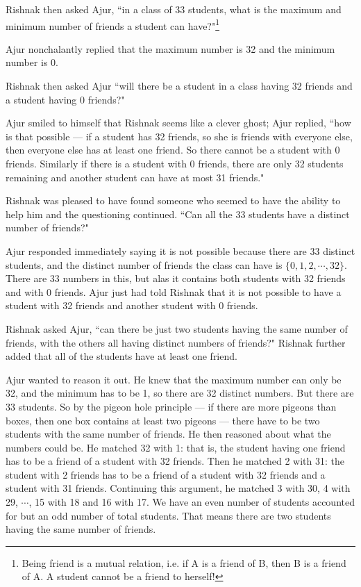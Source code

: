  Rishnak then asked Ajur, ``in a class of 33 students, what is the maximum and minimum number of friends a student can have?"\footnote{Being friend is a mutual relation, i.e. if A is a friend of B, then B is a friend of A. A student cannot be a friend to herself!}
 
 Ajur nonchalantly replied that the maximum number is 32 and the minimum number is 0.
 
 Rishnak then asked Ajur ``will there be a student in a class having 32 friends and a student having 0 friends?"
 
 Ajur smiled to himself that Rishnak seems like a clever ghost; Ajur replied, ``how is that possible --- if a student has 32 friends, so she is friends with everyone else, then everyone else has at least one friend. So there cannot be a student with 0 friends. Similarly if there is a student with 0 friends, there are only 32 students remaining and another student can have at most 31 friends."
 
 Rishnak was pleased to have found someone who seemed to have the ability to help him and the questioning continued. ``Can all the 33 students have a distinct number of friends?"
 
 Ajur responded immediately saying it is not possible because there are 33 distinct students, and the distinct number of friends the class can have is $\{0,1,2,\cdots,32\}$. There are 33 numbers in this, but alas it contains both students with 32 friends and with 0 friends. Ajur just had told Rishnak that it is not possible to have a student with 32 friends and another student with 0 friends.
 
 Rishnak asked Ajur, ``can there be just two students having the same number of friends, with the others all having distinct numbers of friends?" Rishnak further added that all of the students have at least one friend.
 
Ajur wanted to reason it out. He knew that the maximum number can only be 32, and the minimum has to be 1, so there are 32 distinct numbers. But there are 33 students. So by the pigeon hole principle --- if there are more pigeons than boxes, then one box contains at least two pigeons --- there have to be two students with the same number of friends.  He then reasoned about what the numbers could be. He matched 32 with 1: that is, the student having one friend has to be a friend of a student with 32 friends. Then he matched 2 with 31: the student with 2 friends has to be a friend of a student with 32 friends and a student with 31 friends. Continuing this argument, he matched 3 with 30, 4 with 29, $\cdots$, 15 with 18 and 16 with 17. We have an even number of students accounted for but an odd number of total students. That means there are two students having the same number of friends.

